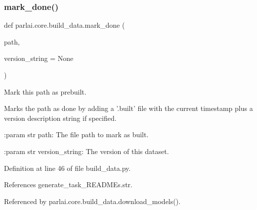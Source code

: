 \subsubsection{\texorpdfstring{mark\+\_\+done()}{mark\_done()}}
{\footnotesize\ttfamily def parlai.\+core.\+build\+\_\+data.\+mark\+\_\+done (\begin{DoxyParamCaption}\item[{}]{path,  }\item[{}]{version\+\_\+string = {\ttfamily None} }\end{DoxyParamCaption})}

\begin{DoxyVerb}Mark this path as prebuilt.

Marks the path as done by adding a '.built' file with the current timestamp
plus a version description string if specified.

:param str path:
    The file path to mark as built.

:param str version_string:
    The version of this dataset.
\end{DoxyVerb}
 

Definition at line 46 of file build\+\_\+data.\+py.



References generate\+\_\+task\+\_\+\+R\+E\+A\+D\+M\+Es.\+str.



Referenced by parlai.\+core.\+build\+\_\+data.\+download\+\_\+models().

